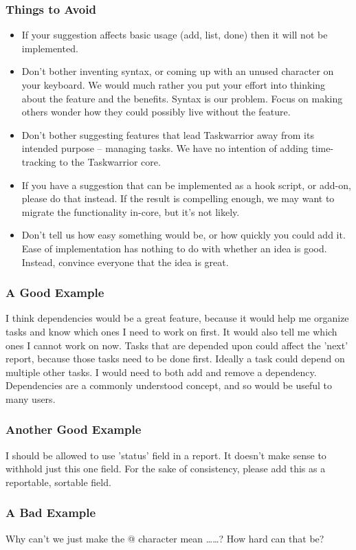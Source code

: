 \documentclass[t,handout]{beamer}
\begin{document}
\begin{frame}[fragile]\frametitle{Things to Avoid}
    \begin{itemize}
    \item If your suggestion affects basic usage (add, list, done) then it will not be implemented.
    \item Don't bother inventing syntax, or coming up with an unused character on your keyboard. We would much rather you put your effort into thinking about the feature and the benefits. Syntax is our problem. Focus on making others wonder how they could possibly live without the feature.
    \item Don't bother suggesting features that lead Taskwarrior away from its intended purpose -- managing tasks. We have no intention of adding time-tracking to the Taskwarrior core.
    \item If you have a suggestion that can be implemented as a hook script, or add-on, please do that instead. If the result is compelling enough, we may want to migrate the functionality in-core, but it's not likely.
    \item Don't tell us how easy something would be, or how quickly you could add it. Ease of implementation has nothing to do with whether an idea is good. Instead, convince everyone that the idea is great.
\end{itemize}
\end{frame}

\begin{frame}[fragile]\frametitle{A Good Example}
    \vfill
    I think dependencies would be a great feature, because it would help me organize tasks and know which ones I need to work on first. It would also tell me which ones I cannot work on now. Tasks that are depended upon could affect the 'next' report, because those tasks need to be done first. Ideally a task could depend on multiple other tasks. I would need to both add and remove a dependency. Dependencies are a commonly understood concept, and so would be useful to many users.
\end{frame}

\begin{frame}[fragile]\frametitle{Another Good Example}
    \vfill
    I should be allowed to use 'status' field in a report. It doesn't make sense to withhold just this one field. For the sake of consistency, please add this as a reportable, sortable field.
\end{frame}

\begin{frame}[fragile]\frametitle{A Bad Example}
    \vfill
    Why can't we just make the @ character mean \ldots\ldots?  How hard can that be?
\end{frame}
\end{document}
